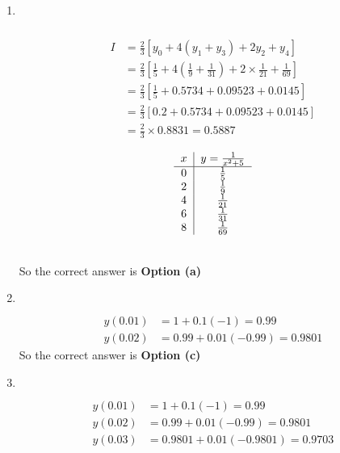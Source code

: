 \begin{enumerate}
\begin{answer}
	\end{answer}
		\item $\left. \right. $
	\begin{answer}$\left. \right. $\\
		\begin{minipage}{0.45\textwidth}
		\begin{align*}
		I&=\frac{2}{3}\left[y_{0}+4\left(y_{1}+y_{3}\right)+2 y_{2}+y_{4}\right]\\
		&=\frac{2}{3}\left[\frac{1}{5}+4\left(\frac{1}{9}+\frac{1}{31}\right)+2 \times \frac{1}{21}+\frac{1}{69}\right]\\
		&=\frac{2}{3}\left[\frac{1}{5}+0.5734+0.09523+0.0145\right]\\
		&=\frac{2}{3}[0.2+0.5734+0.09523+0.0145]\\
		&=\frac{2}{3} \times 0.8831=0.5887
		\end{align*}
	\end{minipage}
	\begin{minipage}{0.45\textwidth}
		\begin{align*}
		\begin{tabular}{c|c}
		$x$ & $y=\frac{1}{x^{2}+5}$ \\
		\hline 0 & $\frac{1}{5}$ \\
		2 & $\frac{1}{9}$ \\
		4 & $\frac{1}{21}$ \\
		6 & $\frac{1}{31}$ \\
		8 & $\frac{1}{69}$
		\end{tabular}
		\end{align*}
	\end{minipage}
	\\So the correct answer is \textbf{Option (a)}
	\end{answer}
	\item $\left. \right. $
	\begin{answer}
		\begin{align*}
		 y(0.01)&=1+0.1(-1)=0.99\\
		y(0.02)&=0.99+0.01(-0.99)=0.9801
		\end{align*}
		So the correct answer is \textbf{Option (c)}
	\end{answer}
	\item  $\left. \right. $
\begin{answer}
	\begin{align*}
	y(0.01)&=1+0.1(-1)=0.99\\
	y(0.02)&=0.99+0.01(-0.99)=0.9801\\
	y(0.03)&=0.9801+0.01(-0.9801)=0.9703\\

\end{align*}
\end{answer}
\end{enumerate}

